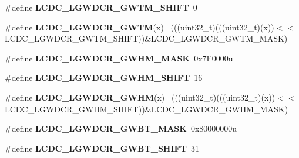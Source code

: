 \begin{DoxyCompactItemize}
\item 
\hypertarget{group___l_c_d_c___register___masks_ga4e82b2036ce7e1351d727978f225490e}{}\#define {\bfseries L\+C\+D\+C\+\_\+\+L\+G\+W\+D\+C\+R\+\_\+\+G\+W\+T\+M\+\_\+\+S\+H\+I\+F\+T}~0\label{group___l_c_d_c___register___masks_ga4e82b2036ce7e1351d727978f225490e}

\item 
\hypertarget{group___l_c_d_c___register___masks_gac91314df2261af22bd0408a627513a68}{}\#define {\bfseries L\+C\+D\+C\+\_\+\+L\+G\+W\+D\+C\+R\+\_\+\+G\+W\+T\+M}(x)                                        ~(((uint32\+\_\+t)(((uint32\+\_\+t)(x))$<$$<$L\+C\+D\+C\+\_\+\+L\+G\+W\+D\+C\+R\+\_\+\+G\+W\+T\+M\+\_\+\+S\+H\+I\+F\+T))\&L\+C\+D\+C\+\_\+\+L\+G\+W\+D\+C\+R\+\_\+\+G\+W\+T\+M\+\_\+\+M\+A\+S\+K)\label{group___l_c_d_c___register___masks_gac91314df2261af22bd0408a627513a68}

\item 
\hypertarget{group___l_c_d_c___register___masks_ga9e8e07575c578f8c1d51b79b5be8d6f5}{}\#define {\bfseries L\+C\+D\+C\+\_\+\+L\+G\+W\+D\+C\+R\+\_\+\+G\+W\+H\+M\+\_\+\+M\+A\+S\+K}~0x7\+F0000u\label{group___l_c_d_c___register___masks_ga9e8e07575c578f8c1d51b79b5be8d6f5}

\item 
\hypertarget{group___l_c_d_c___register___masks_ga2d502b8ffc832e81152bf44f19e5845e}{}\#define {\bfseries L\+C\+D\+C\+\_\+\+L\+G\+W\+D\+C\+R\+\_\+\+G\+W\+H\+M\+\_\+\+S\+H\+I\+F\+T}~16\label{group___l_c_d_c___register___masks_ga2d502b8ffc832e81152bf44f19e5845e}

\item 
\hypertarget{group___l_c_d_c___register___masks_gac22c12f45cc65afa6029c15bdde11f5f}{}\#define {\bfseries L\+C\+D\+C\+\_\+\+L\+G\+W\+D\+C\+R\+\_\+\+G\+W\+H\+M}(x)                                        ~(((uint32\+\_\+t)(((uint32\+\_\+t)(x))$<$$<$L\+C\+D\+C\+\_\+\+L\+G\+W\+D\+C\+R\+\_\+\+G\+W\+H\+M\+\_\+\+S\+H\+I\+F\+T))\&L\+C\+D\+C\+\_\+\+L\+G\+W\+D\+C\+R\+\_\+\+G\+W\+H\+M\+\_\+\+M\+A\+S\+K)\label{group___l_c_d_c___register___masks_gac22c12f45cc65afa6029c15bdde11f5f}

\item 
\hypertarget{group___l_c_d_c___register___masks_gacc372fad20856af675b44db2a095135e}{}\#define {\bfseries L\+C\+D\+C\+\_\+\+L\+G\+W\+D\+C\+R\+\_\+\+G\+W\+B\+T\+\_\+\+M\+A\+S\+K}~0x80000000u\label{group___l_c_d_c___register___masks_gacc372fad20856af675b44db2a095135e}

\item 
\hypertarget{group___l_c_d_c___register___masks_gaa73b4d55232a8b9a7fc39c70692a22f6}{}\#define {\bfseries L\+C\+D\+C\+\_\+\+L\+G\+W\+D\+C\+R\+\_\+\+G\+W\+B\+T\+\_\+\+S\+H\+I\+F\+T}~31\label{group___l_c_d_c___register___masks_gaa73b4d55232a8b9a7fc39c70692a22f6}


\end{DoxyCompactItemize}
